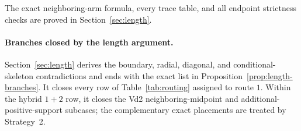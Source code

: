 The exact neighboring-arm formula, every trace table, and all endpoint
strictness checks are proved in Section~\ref{sec:length}.

\paragraph{Branches closed by the length argument.}
Section~\ref{sec:length} derives the boundary, radial, diagonal, and
conditional-skeleton contradictions and ends with the exact list in
Proposition~\ref{prop:length-branches}.  It closes every row of
Table~\ref{tab:routing} assigned to route $1$.  Within the hybrid $1+2$ row,
it closes the Vd2 neighboring-midpoint and additional-positive-support
subcases; the complementary exact placements are treated by Strategy~2.
